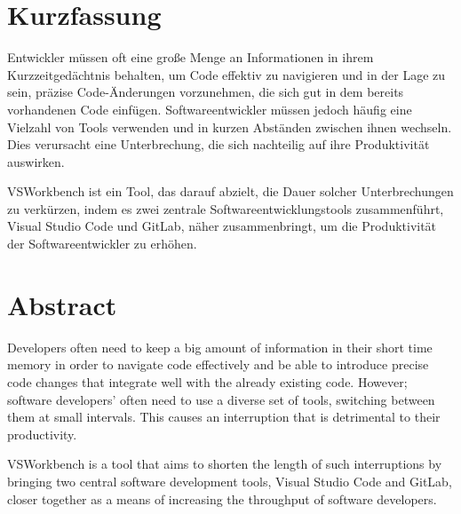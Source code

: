 \section*{Kurzfassung}
Entwickler müssen oft eine große Menge an Informationen in ihrem Kurzzeitgedächtnis behalten, um Code effektiv zu navigieren und in der Lage zu sein,
präzise Code-Änderungen vorzunehmen, die sich gut in dem bereits vorhandenen Code einfügen. Softwareentwickler müssen jedoch häufig eine
Vielzahl von Tools verwenden und in kurzen Abständen zwischen ihnen wechseln. Dies verursacht eine Unterbrechung, die sich
nachteilig auf ihre Produktivität auswirken. 

VSWorkbench ist ein Tool, das darauf abzielt, die Dauer solcher Unterbrechungen zu verkürzen,
indem es zwei zentrale Softwareentwicklungstools zusammenführt, Visual Studio Code und GitLab, näher zusammenbringt, um die Produktivität 
der Softwareentwickler zu erhöhen. 

\begingroup
	
	\section*{Abstract}

    
    Developers often need to keep a big amount of information in their short time memory in order to navigate code effectively and be able to introduce precise code
    changes that integrate well with the already existing code.
    However; software developers' often need to use a diverse set of tools, switching between them at small intervals. This causes an interruption 
    that is detrimental to their productivity. 
    
    VSWorkbench is a tool that aims to shorten the length of such interruptions by bringing two central software development tools, 
    Visual Studio Code and GitLab, closer together as a means of increasing the throughput of software developers. 


	
\endgroup

